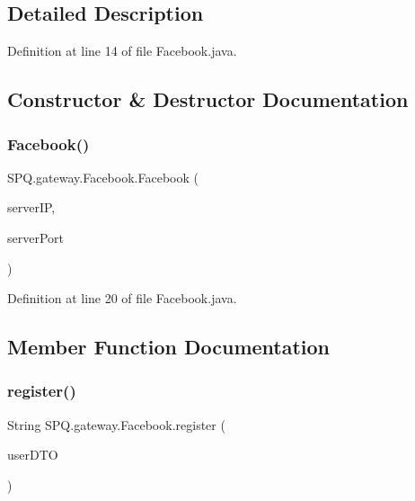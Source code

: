 \subsection{Detailed Description}


Definition at line 14 of file Facebook.\+java.



\subsection{Constructor \& Destructor Documentation}
\mbox{\label{class_s_p_q_1_1gateway_1_1_facebook_a428ab89808ef8f9d2d0ac5e60c9135e3}} 
\subsubsection{\texorpdfstring{Facebook()}{Facebook()}}
{\footnotesize\ttfamily S\+P\+Q.\+gateway.\+Facebook.\+Facebook (\begin{DoxyParamCaption}\item[{String}]{server\+IP,  }\item[{String}]{server\+Port }\end{DoxyParamCaption})}



Definition at line 20 of file Facebook.\+java.



\subsection{Member Function Documentation}
\mbox{\label{class_s_p_q_1_1gateway_1_1_facebook_aba03bc89c530d3f2159b3a1eb65c3427}} 
\subsubsection{\texorpdfstring{register()}{register()}}
{\footnotesize\ttfamily String S\+P\+Q.\+gateway.\+Facebook.\+register (\begin{DoxyParamCaption}\item[{\mbox{\hyperlink{class_s_p_q_1_1dto_1_1_user_d_t_o}{User\+D\+TO}}}]{user\+D\+TO }\end{DoxyParamCaption})}



